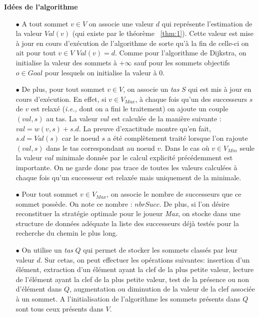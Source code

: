 \noindent \textbf{Idées de l'algorithme}\\

\begin{enumerate}
	
	\item[$\bullet$] A tout sommet $v \in V$ on associe une valeur $d$ qui représente l'estimation de la valeur $Val(v)$ (qui existe par le théorème ~\ref{thm:1}). Cette valeur est mise à jour en cours d'exécution de l'algorithme de sorte qu'à la fin de celle-ci on ait pour tout $v \in V$ $Val(v) = d$. Comme pour l'algorithme de Dijkstra, on initialise la valeur des sommets à $+\infty$ sauf pour les sommets objectifs $o \in Goal$ pour lesquels on initialise la valeur à 0.
	
	\item[$\bullet$] De plus, pour tout sommet $v \in V$, on associe un \textit{tas} $S$  qui est mis à jour en cours d'exécution. En effet, si $v \in V_{Max}$, à chaque fois qu'un des successeurs $s$ de $v$ est relaxé (\emph{i.e.,} dont on a fini le traitement) on ajoute un couple $(val,s)$ au tas. La valeur $val$ est calculée de la manière suivante : $val = w(v,s) + s.d$. La preuve d'exactitude montre qu'en fait, $s.d = Val(s)$ car le noeud $s$ a été complètement traité lorsque l'on rajoute $(val,s)$ dans le tas correspondant au noeud $v$. Dans le cas où $v \in V_{Min}$ seule la valeur $val$ minimale donnée par le calcul explicité précédemment est importante. On ne garde donc pas trace de toutes les valeurs calculées à chaque fois qu'un successeur est relaxée mais uniquement de la minimale.
	
	\item[$\bullet$] Pour tout sommet $v \in V_{Max}$, on associe le nombre de successeurs que ce sommet possède. On note ce nombre : $nbrSucc$. De plus, si l'on désire reconstituer la stratégie optimale pour le joueur \textit{Max}, on stocke dans une structure de données adéquate la liste des successeurs déjà testés pour la recherche du chemin le plus long.
	
		\item[$\bullet$] On utilise un \textit{tas} $Q$ qui permet de stocker les sommets classés par leur valeur $d$. Sur cetas, on peut effectuer les opérations suivantes: insertion d'un élément, extraction d'un élément ayant la clef de la plus petite valeur, lecture de l'élément ayant la clef de la plus petite valeur, test de la présence ou non d'élément dans $Q$, augmentation ou diminution de la valeur de la clef associée à un sommet. A l'initialisation de l'algorithme les sommets présents dans $Q$ sont tous ceux présents dans $V$.
	

\end{enumerate}
